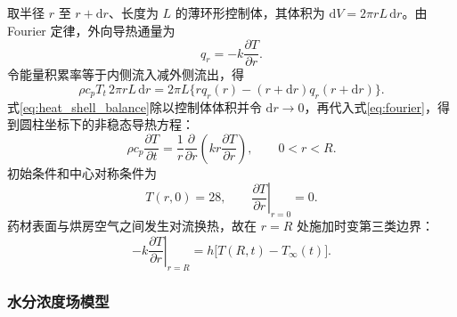 \documentclass[withoutpreface,bwprint]{cumcmthesis}
\begin{document}
取半径 $r$ 至 $r+\mathrm{d}r$、长度为 $L$ 的薄环形控制体，其体积为 $\mathrm{d}V=2\pi rL\,\mathrm{d}r$。由 Fourier 定律，外向导热通量为
\begin{equation}
q_r=-k\frac{\partial T}{\partial r}.
\label{eq:fourier}
\end{equation}
令能量积累率等于内侧流入减外侧流出，得
\begin{equation}
\rho c_pT_t\,2\pi rL\,\mathrm dr
=2\pi L\{rq_r(r)-(r+\mathrm dr)q_r(r+\mathrm dr)\}.
\label{eq:heat_shell_balance}
\end{equation}
式\eqref{eq:heat_shell_balance}除以控制体体积并令 $\mathrm dr\to0$，再代入式\eqref{eq:fourier}，得到圆柱坐标下的非稳态导热方程：
\begin{equation}
\rho c_p\frac{\partial T}{\partial t}
=\frac{1}{r}\frac{\partial}{\partial r}
\left(kr\frac{\partial T}{\partial r}\right),
\qquad 0<r<R.
\label{eq:heat_pde}
\end{equation}
初始条件和中心对称条件为
\begin{equation}
T(r,0)=28,\qquad
\left.\frac{\partial T}{\partial r}\right|_{r=0}=0.
\label{eq:heat_initial_center}
\end{equation}
药材表面与烘房空气之间发生对流换热，故在 $r=R$ 处施加时变第三类边界：
\begin{equation}
-k\left.\frac{\partial T}{\partial r}\right|_{r=R}
=h\bigl[T(R,t)-T_\infty(t)\bigr].
\label{eq:heat_robin}
\end{equation}

\subsubsection{水分浓度场模型}
\end{document}
